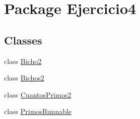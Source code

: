 \hypertarget{namespace_ejercicio4}{}\section{Package Ejercicio4}
\label{namespace_ejercicio4}
\subsection*{Classes}
\begin{DoxyCompactItemize}
\item 
class \mbox{\hyperlink{class_ejercicio4_1_1_bicho2}{Bicho2}}
\item 
class \mbox{\hyperlink{class_ejercicio4_1_1_bichos2}{Bichos2}}
\item 
class \mbox{\hyperlink{class_ejercicio4_1_1_cuantos_primos2}{Cuantos\+Primos2}}
\item 
class \mbox{\hyperlink{class_ejercicio4_1_1_primos_runnable}{Primos\+Runnable}}
\end{DoxyCompactItemize}
